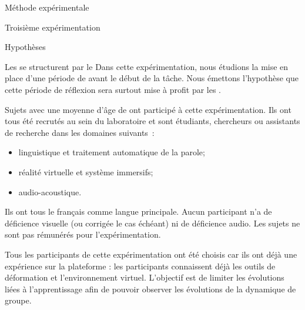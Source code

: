 \documentclass[myfrancais,ngerman,english,french]{mythesis}
\begin{document}
\begin{mychapter}{Méthode expérimentale}
\begin{mysection}{Troisième expérimentation}
\begin{mysubsection}{Hypothèses}
\begin{myparagraph}{ Les  se structurent par le \mybrainstorming}
					Dans cette expérimentation, nous étudions la mise en place d'une période de \mybrainstorming avant le début de la tâche.
					Nous émettons l'hypothèse que cette période de réflexion sera surtout mise à profit par les .
				\end{myparagraph}
			\end{mysubsection}
			\begin{mysubsection}{Sujets}
				 avec une moyenne d'âge de  ont participé à cette expérimentation.
				Ils ont tous été recrutés au sein du laboratoire  et sont étudiants, chercheurs ou assistants de recherche dans les domaines suivants~:
				\begin{itemize}
					\item linguistique et traitement automatique de la parole;
					\item réalité virtuelle et système immersifs;
					\item audio-acoustique.
				\end{itemize}
				Ils ont tous le français comme langue principale.
				Aucun participant n'a de déficience visuelle (ou corrigée le cas échéant) ni de déficience audio.
				Les sujets ne sont pas rémunérés pour l'expérimentation.

				Tous les participants de cette expérimentation ont été choisis car ils ont déjà une expérience sur la plateforme : les participants connaissent déjà les outils de déformation et l'environnement virtuel.
				L'objectif est de limiter les évolutions liées à l'apprentissage afin de pouvoir observer les évolutions de la dynamique de groupe.


\end{mysubsection}
\end{mysection}
\end{mychapter}
\end{document}
